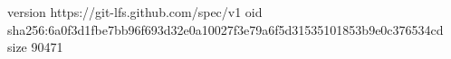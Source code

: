 version https://git-lfs.github.com/spec/v1
oid sha256:6a0f3d1fbe7bb96f693d32e0a10027f3e79a6f5d31535101853b9e0c376534cd
size 90471

